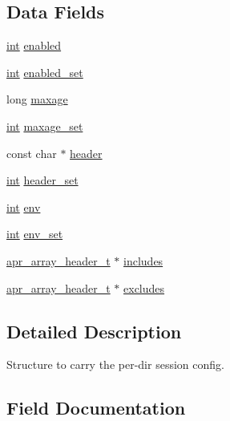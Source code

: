 \subsection*{Data Fields}
\begin{DoxyCompactItemize}
\item 
\hyperlink{pcre_8txt_a42dfa4ff673c82d8efe7144098fbc198}{int} \hyperlink{structsession__dir__conf_a4e37d03bbdde982c037a457aef62834f}{enabled}
\item 
\hyperlink{pcre_8txt_a42dfa4ff673c82d8efe7144098fbc198}{int} \hyperlink{structsession__dir__conf_a5447e1d7a9035f9566c58aa19bcda0ff}{enabled\+\_\+set}
\item 
long \hyperlink{structsession__dir__conf_a581e40d0a8c41456d9275467f06cca38}{maxage}
\item 
\hyperlink{pcre_8txt_a42dfa4ff673c82d8efe7144098fbc198}{int} \hyperlink{structsession__dir__conf_a4578c2a3eee395c1e226778f4ab17eb0}{maxage\+\_\+set}
\item 
const char $\ast$ \hyperlink{structsession__dir__conf_a447e820142780b447fdeb43dbacf5fe7}{header}
\item 
\hyperlink{pcre_8txt_a42dfa4ff673c82d8efe7144098fbc198}{int} \hyperlink{structsession__dir__conf_a1ec17c421e6aa7e00f59ff0597c0d73b}{header\+\_\+set}
\item 
\hyperlink{pcre_8txt_a42dfa4ff673c82d8efe7144098fbc198}{int} \hyperlink{structsession__dir__conf_a447aaa950f66122905738fec1ed93a8b}{env}
\item 
\hyperlink{pcre_8txt_a42dfa4ff673c82d8efe7144098fbc198}{int} \hyperlink{structsession__dir__conf_aff1684e51911762f112d8c235283261c}{env\+\_\+set}
\item 
\hyperlink{structapr__array__header__t}{apr\+\_\+array\+\_\+header\+\_\+t} $\ast$ \hyperlink{structsession__dir__conf_a27baa9b1ab583516269f1e84a2486235}{includes}
\item 
\hyperlink{structapr__array__header__t}{apr\+\_\+array\+\_\+header\+\_\+t} $\ast$ \hyperlink{structsession__dir__conf_accf5c2c5965a0f2b46ba3c95f58b1c7b}{excludes}
\end{DoxyCompactItemize}


\subsection{Detailed Description}
Structure to carry the per-\/dir session config. 

\subsection{Field Documentation}

